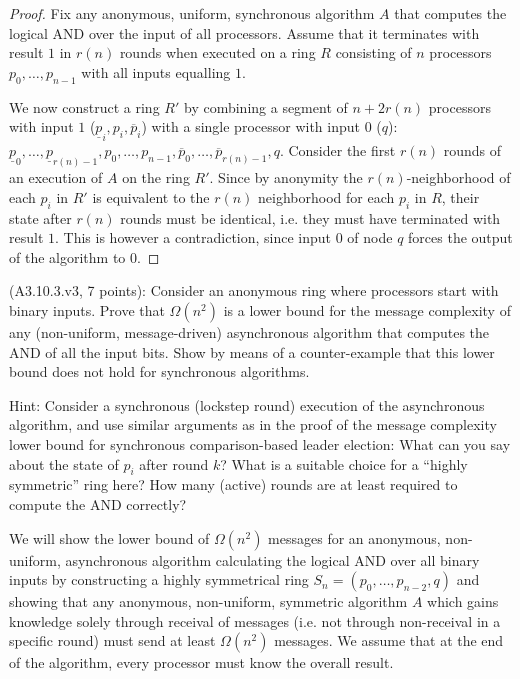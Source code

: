 \begin{proof}
Fix any anonymous, uniform, synchronous algorithm $A$ that computes the logical AND over the input of
all processors. Assume that it terminates with result $1$ in $r(n)$ rounds when executed on a ring $R$ consisting
of $n$ processors $p_0, \ldots, p_{n-1}$ with all inputs equalling $1$.

We now construct a ring $R'$ by combining a segment of $n + 2r(n)$ processors with input $1$
($\underline{p}_i, p_i, \overline{p}_i$) with a single processor with input $0$ ($q$):
$\underline{p}_0, \ldots, \underline{p}_{r(n) - 1},
 p_0, \ldots, p_{n-1},
 \overline{p}_0, \ldots, \overline{p}_{r(n) - 1},
 q.$
Consider the first $r(n)$ rounds of an execution of $A$ on the ring $R'$. Since by anonymity
the $r(n)$-neighborhood
of each $p_i$ in $R'$ is equivalent to the $r(n)$ neighborhood for each $p_i$ in $R$, their state
after $r(n)$ rounds must be identical, i.e. they must have terminated with result $1$. This is however
a contradiction, since input $0$ of node $q$ forces the output of the algorithm to $0$.
\end{proof}


\begin{Exc}{(A3.10.3.v3, 7 points):}
Consider an anonymous ring where processors start with binary
inputs. Prove that $\Omega(n^2)$ is a lower bound for the
message complexity of any (non-uniform, message-driven)
asynchronous algorithm that computes the AND of all the
input bits. Show by means of a counter-example that this
lower bound does not hold for synchronous algorithms.

\normalfont
Hint: Consider a synchronous (lockstep round) execution of the asynchronous
algorithm, and use similar arguments as in the proof of the message complexity lower bound
for synchronous comparison-based leader election: What can you say about the state of $p_i$ after
round $k$? What is a suitable choice for a ``highly symmetric'' ring here? How many
(active) rounds are at least required to compute the AND correctly?
\end{Exc}

We will show the lower bound of $\Omega(n^2)$ messages for an anonymous, non-uniform,
asynchronous algorithm calculating the logical AND over all binary inputs by
constructing a highly symmetrical ring $S_n = (p_0, \ldots, p_{n-2}, q)$ and showing
that any anonymous, non-uniform, symmetric algorithm $A$ which gains knowledge solely
through receival of messages (i.e. not through non-receival in a specific round)
must send at least $\Omega(n^2)$ messages.
We assume
that at the end of the algorithm, every processor must know the overall result.


